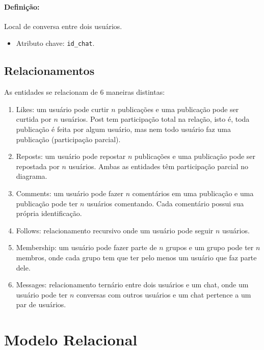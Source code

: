 \documentclass{article}
\begin{document}
\paragraph{Definição:} Local de conversa entre dois usuários.
\begin{itemize}
        \item Atributo chave: \verb|id_chat|.
\end{itemize}

\subsection{Relacionamentos}
As entidades se relacionam de 6 maneiras distintas:
\begin{enumerate}
        \item Likes: um usuário pode curtir $n$ publicações e uma publicação pode ser curtida por $n$ usuários. Post tem participação total na relação, isto é, toda publicação é feita por algum usuário, mas nem todo usuário faz uma publicação (participação parcial).
        \item Reposts: um usuário pode repostar $n$ publicações e uma publicação pode ser repostada por $n$ usuários. Ambas as entidades têm participação parcial no diagrama.
        \item Comments: um usuário pode fazer $n$ comentários em uma publicação e uma publicação pode ter $n$ usuários comentando. Cada comentário possui sua própria identificação.
        \item Follows: relacionamento recursivo onde um usuário pode seguir $n$ usuários.
        \item Membership: um usuário pode fazer parte de $n$ grupos e um grupo pode ter $n$ membros, onde cada grupo tem que ter pelo menos um usuário que faz parte dele.
        \item Messages: relacionamento ternário entre dois usuários e um chat, onde um usuário pode ter $n$ conversas com outros usuários e um chat pertence a um par de usuários.
\end{enumerate}

\section{Modelo Relacional}
\end{document}
